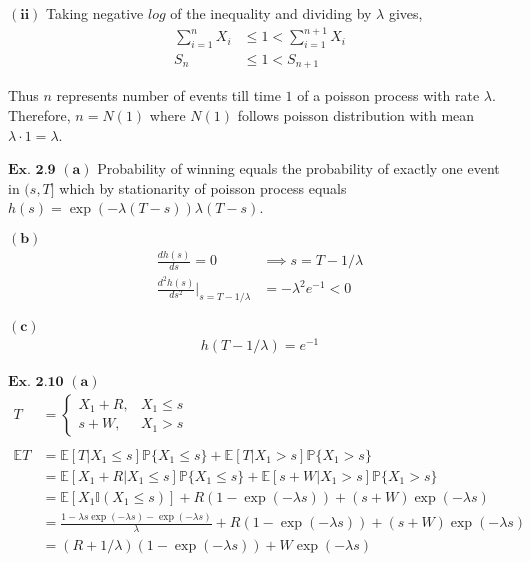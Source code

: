 \documentclass{article}
\begin{document}
$\mathbf{(ii)}$
Taking negative $log$ of the inequality and dividing by $\lambda$ gives,
\begin{align*}
\sum_{i=1}^{n}X_i &\leq 1 < \sum_{i=1}^{n+1}X_i\\
S_{n} &\leq 1 < S_{n+1}
\end{align*}

Thus $n$ represents number of events till time $1$ of a poisson process with rate $\lambda$. Therefore, $n = N(1)$ where $N(1)$ follows poisson distribution with mean $\lambda \cdot 1 = \lambda$.

\vspace{0.2in}
${\textbf{Ex. 2.9}}$
$\mathbf{(a)}$
Probability of winning equals the probability of exactly one event in $(s,T]$ which by stationarity of poisson process equals $h(s) = \exp(-\lambda(T-s))\lambda(T-s)$.

$\mathbf{(b)}$
\begin{align*}
\frac{dh(s)}{ds} = 0 &\implies s = T-1/\lambda\\
\frac{d^2h(s)}{ds^2}\bigg\vert_{s=T-1/\lambda} &= -\lambda^2 e^{-1} < 0 
\end{align*}

$\mathbf{(c)}$
\begin{align*}
h(T-1/\lambda) = e^{-1}
\end{align*}

\vspace{0.2in}
${\textbf{Ex. 2.10}}$
$\mathbf{(a)}$
\begin{align*}
T &= \left\{\begin{matrix}X_1 + R, & X_1\leq s\\ s+W, & X_1 > s\end{matrix}\right.\\\\
\mathbb{E}T &= \mathbb{E}[T|X_1 \leq s]\mathbb{P}\{X_1 \leq s\} + \mathbb{E}[T|X_1 >s ]\mathbb{P}\{X_1 > s\}\\
&= \mathbb{E}[X_1+R|X_1 \leq s]\mathbb{P}\{X_1 \leq s\} + \mathbb{E}[s+W|X_1>s]\mathbb{P}\{X_1 > s\}\\
&= \mathbb{E}[X_1\mathbb{I}(X_1\leq s)] + R(1-\exp(-\lambda s)) + (s+W)\exp(-\lambda s)\\
&= \frac{1-\lambda s \exp(-\lambda s) - \exp(-\lambda s)}{\lambda} + R(1-\exp(-\lambda s)) + (s+W)\exp(-\lambda s)\\
&= (R + 1/\lambda)(1-\exp(-\lambda s)) + W\exp(-\lambda s)\\
\end{align*}
\end{document}
